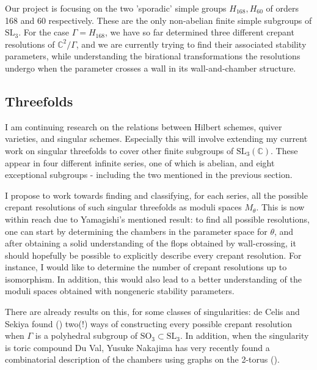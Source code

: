 \documentclass[11pt,a4paper ]{article}        %
\newcommand{\C}{\mathbb{C}}    						%
\begin{document}
Our project is focusing on the two 'sporadic' simple groups $H_{168}, H_{60}$ of orders 168 and 60 respectively. These are the only non-abelian finite simple subgroups of $\mathrm{SL}_3$. For the case $\Gamma = H_{168}$, we have so far determined three different crepant resolutions of $\C^2/\Gamma$, and we are currently trying to find their associated stability parameters, while understanding the birational transformations the resolutions undergo when the parameter crosses a wall in its wall-and-chamber structure.
\subsection*{Threefolds}
I am continuing research on the relations between Hilbert schemes, quiver varieties, and singular schemes. Especially this will involve extending my current work on singular threefolds to cover other finite subgroups of $\mathrm{SL}_3(\C)$. These appear in four different infinite series, one of which is abelian, and eight exceptional subgroups - including the two mentioned in the previous section. 

I propose to work towards finding and classifying, for each series, all the possible crepant resolutions of such singular threefolds as moduli spaces $M_\theta$. This is now within reach due to Yamagishi's mentioned result: to find all possible resolutions, one can start by determining the chambers in the parameter space for $\theta$, and after obtaining a solid understanding of the flops obtained by wall-crossing, it should hopefully be possible to explicitly describe every crepant resolution. For instance, I would like to determine the number of crepant resolutions up to isomorphism.  In addition, this would also lead to a better understanding of the moduli spaces obtained with nongeneric stability parameters. 


There are already results on this, for some classes of singularities: de Celis and Sekiya found (\cite{deCelisSekiya}) two(!) ways of constructing every possible crepant resolution when $\Gamma$ is a polyhedral subgroup of $\mathrm{SO}_3\subset \mathrm{SL}_3$. In addition, when the singularity is toric compound Du Val, Yusuke Nakajima has very recently found a combinatorial description of the chambers using graphs on the 2-torus (\cite{nakajimaYusuke}).
\end{document}
